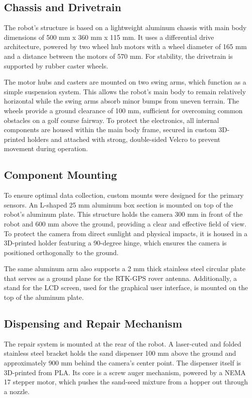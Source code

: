 \subsection{Chassis and Drivetrain}
\label{ssec:chassis_drivetrain}
The robot's structure is based on a lightweight aluminum chassis with main body dimensions of 500 mm x 360 mm x 115 mm. It uses a differential drive architecture, powered by two wheel hub motors with a wheel diameter of 165 mm and a distance between the motors of 570 mm. For stability, the drivetrain is supported by rubber caster wheels.

The motor hubs and casters are mounted on two swing arms, which function as a simple suspension system. This allows the robot's main body to remain relatively horizontal while the swing arms absorb minor bumps from uneven terrain. The wheels provide a ground clearance of 100 mm, sufficient for overcoming common obstacles on a golf course fairway. To protect the electronics, all internal components are housed within the main body frame, secured in custom 3D-printed holders and attached with strong, double-sided Velcro to prevent movement during operation.

\subsection{Component Mounting}
\label{ssec:component_mounting}
To ensure optimal data collection, custom mounts were designed for the primary sensors. An L-shaped 25 mm aluminum box section is mounted on top of the robot's aluminum plate. This structure holds the camera 300 mm in front of the robot and 600 mm above the ground, providing a clear and effective field of view. To protect the camera from direct sunlight and physical impacts, it is housed in a 3D-printed holder featuring a 90-degree hinge, which ensures the camera is positioned orthogonally to the ground.

The same aluminum arm also supports a 2 mm thick stainless steel circular plate that serves as a ground plane for the RTK-GPS rover antenna. Additionally, a stand for the LCD screen, used for the graphical user interface, is mounted on the top of the aluminum plate.

\subsection{Dispensing and Repair Mechanism}
\label{ssec:dispenser_mechanism}
The repair system is mounted at the rear of the robot. A laser-cuted and folded stainless steel bracket holds the sand dispenser 100 mm above the ground and approximately 900 mm behind the camera's center point. The dispenser itself is 3D-printed from \gls{PLA}. Its core is a screw auger mechanism, powered by a NEMA 17 stepper motor, which pushes the sand-seed mixture from a hopper out through a nozzle.

